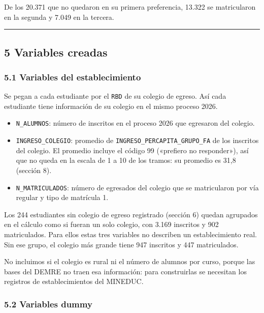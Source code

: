 \documentclass[11pt]{article}
\begin{document}
De los 20.371 que no quedaron en su primera preferencia, 13.322 se
matricularon en la segunda y 7.049 en la tercera.

\medskip\hrule\medskip

\subsection*{5 \; Variables creadas}

\subsubsection*{5.1 \; Variables del establecimiento}

Se pegan a cada estudiante por el \texttt{RBD} de su colegio de egreso.
Así cada estudiante tiene información de su colegio en el mismo proceso
2026.

\begin{itemize}[leftmargin=1.5em, itemsep=0.3em]
  \item \texttt{N\_ALUMNOS}: número de inscritos en el proceso 2026 que
        egresaron del colegio.
  \item \texttt{INGRESO\_COLEGIO}: promedio de
        \texttt{INGRESO\_PERCAPITA\_GRUPO\_FA} de los inscritos del
        colegio. El promedio incluye el código 99 («prefiero no
        responder»), así que no queda en la escala de 1 a 10 de los
        tramos: su promedio es 31,8 (sección 8).
  \item \texttt{N\_MATRICULADOS}: número de egresados del colegio que se
        matricularon por vía regular y tipo de matrícula 1.
\end{itemize}

Los 244 estudiantes sin colegio de egreso registrado (sección 6) quedan
agrupados en el cálculo como si fueran un solo colegio, con 3.169
inscritos y 902 matriculados. Para ellos estas tres variables no
describen un establecimiento real. Sin ese grupo, el colegio más grande
tiene 947 inscritos y 447 matriculados.

No incluimos si el colegio es rural ni el número de alumnos por curso,
porque las bases del DEMRE no traen esa información: para construirlas
se necesitan los registros de establecimientos del MINEDUC.

\subsubsection*{5.2 \; Variables dummy}
\end{document}
